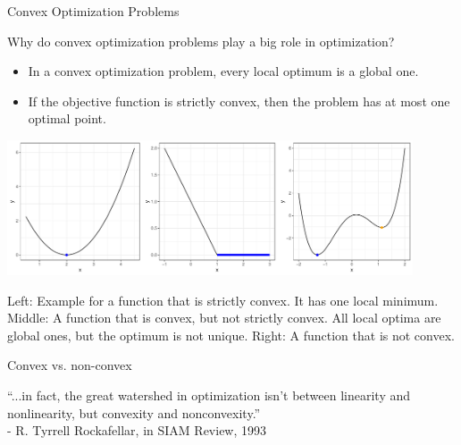 \begin{vbframe}{Convex Optimization Problems}
  
  Why do convex optimization problems play a big role in optimization? 
  
  \begin{itemize}
    \item In a convex optimization problem, every local optimum is a global one.  
    \item If the objective function is strictly convex, then the problem has at most one optimal point. 
  \end{itemize}
  
  \begin{center}
  \includegraphics[width = 0.9\textwidth]{figure_man/convexity_3.pdf} \\
  \begin{footnotesize}
  Left: Example for a function that is strictly convex. It has one local minimum. Middle: A function that is convex, but not strictly convex. All local optima are global ones, but the optimum is not unique. Right: A function that is not convex. 
  \end{footnotesize} 
  \end{center}
  
\end{vbframe}


\begin{vbframe}{Convex vs. non-convex}

\vspace*{2cm}

\begin{center}
\Large{\enquote{...in fact, the great watershed in optimization isn't between linearity and nonlinearity, but convexity and nonconvexity.}}\\
\normalsize - R. Tyrrell Rockafellar, in SIAM Review, 1993
\end{center}

	
\end{vbframe}

\endlecture
